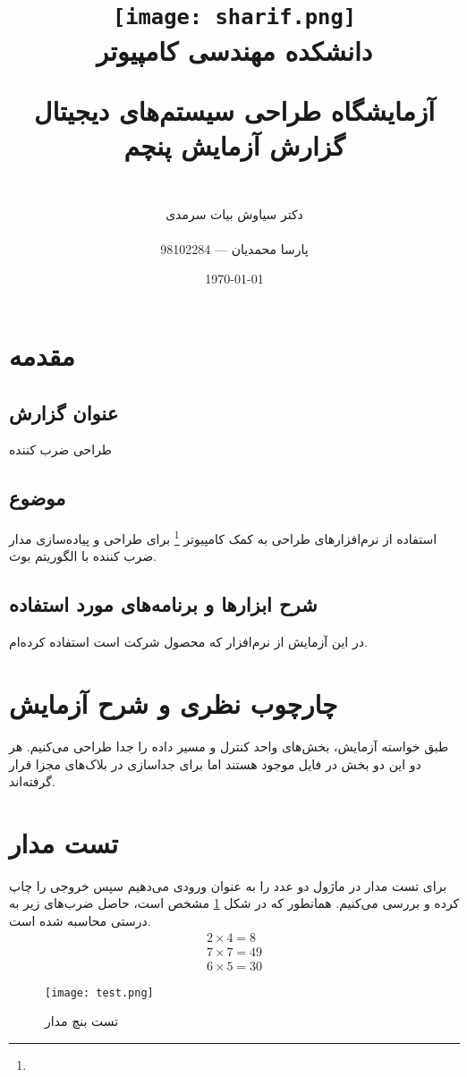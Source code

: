 \documentclass[fleqn]{article}
\title{
\texttt{[image: sharif.png]}\\
\normalsize{دانشکده مهندسی کامپیوتر}\\
\vspace{1cm}
	
\huge{آزمایشگاه طراحی سیستم‌های دیجیتال}
\\
\Large{گزارش آزمایش پنچم}
\\
}
\author{
\\
دکتر سیاوش بیات سرمدی
\\
\\
پارسا محمدیان --- 98102284
}
\date{\today}
\begin{document}
\clearpage\maketitle
\thispagestyle{empty}

\newpage

\pagestyle{fancy}



\tableofcontents

\setcounter{page}{1}

\newpage

\section{مقدمه}

\subsection*{عنوان گزارش}
طراحی ضرب کننده
\subsection*{موضوع}
استفاده از نرم‌افزارهای طراحی به کمک کامپیوتر \footnote{} برای طراحی 
و پیاده‌سازی مدار ضرب کننده با الگوریتم بوث.
\subsection*{شرح ابزارها و برنامه‌های مورد استفاده}
در این آزمایش از نرم‌افزار  که محصول شرکت  است 
استفاده کرده‌ام.

\section{چارچوب نظری و شرح آزمایش}
طبق خواسته آزمایش، بخش‌های واحد کنترل و مسیر داده را جدا طراحی می‌کنیم. هر دو 
این دو بخش در فایل 
موجود هستند اما برای جداسازی در بلاک‌های 
 مجزا قرار گرفته‌اند.

\section{تست مدار}
برای تست مدار در ماژول 
دو عدد را به عنوان ورودی می‌دهیم سپس خروجی را چاپ کرده و بررسی می‌کنیم. 
همانطور که در شکل 
\ref{test}
مشخص است، حاصل ضرب‌های زیر به درستی محاسبه شده است.
\begin{align*}
	2 \times 4 = 8 \\
	7 \times 7 = 49 \\
	6 \times 5 = 30
\end{align*}


\begin{figure}
	\center
	\texttt{[image: test.png]}
	\caption{تست بنچ مدار}
	\label{test}
\end{figure}
\end{document}
